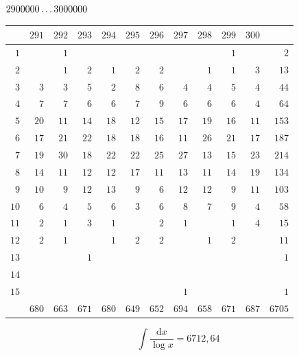 \par\medskip
\noindent\begin{minipage}{\linewidth}\centering
{}
\(2900000\mathinner{.\,.\,.}3000000\)\par\smallskip
\begingroup\fontsize{10.5}{11.5}\selectfont\setlength{\tabcolsep}{3.5pt}\renewcommand{\arraystretch}{1}
\begin{tabular}{r|rrrrrrrrrr|r}\hline
 & $291$ & $292$ & $293$ & $294$ & $295$ & $296$ & $297$ & $298$ & $299$ & $300$ &  \\ \hline
$1$ &  & $1$ &  &  &  &  &  &  & $1$ &  & $2$ \\
$2$ &  & $1$ & $2$ & $1$ & $2$ & $2$ &  & $1$ & $1$ & $3$ & $13$ \\
$3$ & $3$ & $3$ & $5$ & $2$ & $8$ & $6$ & $4$ & $4$ & $5$ & $4$ & $44$ \\
$4$ & $7$ & $7$ & $6$ & $6$ & $7$ & $9$ & $6$ & $6$ & $6$ & $4$ & $64$ \\
$5$ & $20$ & $11$ & $14$ & $18$ & $12$ & $15$ & $17$ & $19$ & $16$ & $11$ & $153$ \\
$6$ & $17$ & $21$ & $22$ & $18$ & $18$ & $16$ & $11$ & $26$ & $21$ & $17$ & $187$ \\
$7$ & $19$ & $30$ & $18$ & $22$ & $22$ & $25$ & $27$ & $13$ & $15$ & $23$ & $214$ \\
$8$ & $14$ & $11$ & $12$ & $12$ & $17$ & $11$ & $13$ & $11$ & $14$ & $19$ & $134$ \\
$9$ & $10$ & $9$ & $12$ & $13$ & $9$ & $6$ & $12$ & $12$ & $9$ & $11$ & $103$ \\
$10$ & $6$ & $4$ & $5$ & $6$ & $3$ & $6$ & $8$ & $7$ & $9$ & $4$ & $58$ \\
$11$ & $2$ & $1$ & $3$ & $1$ &  & $2$ & $1$ &  & $1$ & $4$ & $15$ \\
$12$ & $2$ & $1$ &  & $1$ & $2$ & $2$ &  & $1$ & $2$ &  & $11$ \\
$13$ &  &  & $1$ &  &  &  &  &  &  &  & $1$ \\
$14$ &  &  &  &  &  &  &  &  &  &  &  \\
$15$ &  &  &  &  &  &  & $1$ &  &  &  & $1$ \\
\hline
 & $680$ & $663$ & $671$ & $680$ & $649$ & $652$ & $694$ & $658$ & $671$ & $687$ & $6705$ \\ \hline
\end{tabular}\par\endgroup
\setlength{\abovedisplayskip}{6pt}\setlength{\belowdisplayskip}{4pt}
\[\int\frac{\mathrm{d}x}{\log x}=6712{,}64\]
\end{minipage}\par
